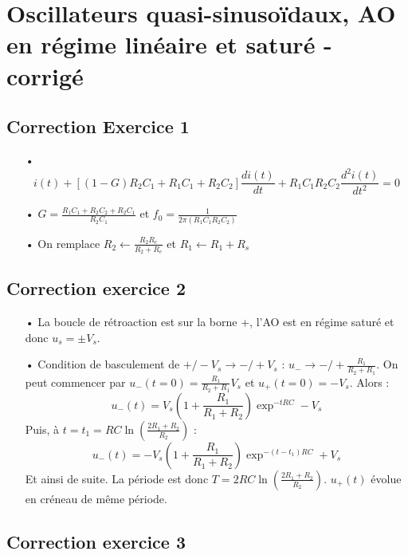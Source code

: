 \documentclass{report}
\begin{document}
\chapter*{Oscillateurs quasi-sinusoïdaux, AO en régime linéaire et saturé - corrigé}

\newpage

\section*{Correction Exercice 1}

\begin{itemize}
	\item[•] 
	\begin{equation}
		i(t) + \left[(1-G)R_2C_1 +R_1C_1+R_2C_2\right]\frac{di(t)}{dt}+R_1C_1R_2C_2\frac{d^2i(t)}{dt^2}=0 
	\end{equation}
	\item[•]  $G=\frac{R_1C_1+R_2C_2+R_2C_1}{R_2C_1}$ et $f_0=\frac{1}{2\pi(R_1C_1R_2C_2)}$
	\item[•] On remplace $R_2\leftarrow\frac{R_2R_e}{R_2+R_e}$ et $R_1\leftarrow R_1+R_s$
\end{itemize}

\section*{Correction exercice 2}

\begin{itemize}
	\item[•] La boucle de rétroaction est sur la borne +, l'AO est en régime saturé et donc $u_s=\pm V_s$. 
	\item[•] Condition de basculement de $+/-V_s\rightarrow-/+V_s$ : $u_-\rightarrow-/+\frac{R_1}{R_2+R_1}$.
	On peut commencer par $u_-(t=0)=\frac{R_1}{R_2+R_1}V_s$ et $u_+(t=0)=-V_s$. Alors :
	\begin{equation}
		u_-(t)=V_s\left(1+\frac{R_1}{R_1+R_2}\right)\exp^{-tRC}-V_s 
	\end{equation}
Puis, à $t=t_1=RC\ln\left(\frac{2R_1+R_2}{R_2} \right)$ :
	\begin{equation}
		u_-(t)=-V_s\left(1+\frac{R_1}{R_1+R_2}\right)\exp^{-(t-t_1)RC}+V_s 
	\end{equation}
Et ainsi de suite. La période est donc $T = 2RC\ln\left(\frac{2R_1+R_2}{R_2} \right)$. $u_+(t)$ évolue en créneau de même période. 
\end{itemize}

\section*{Correction exercice 3}
\end{document}
